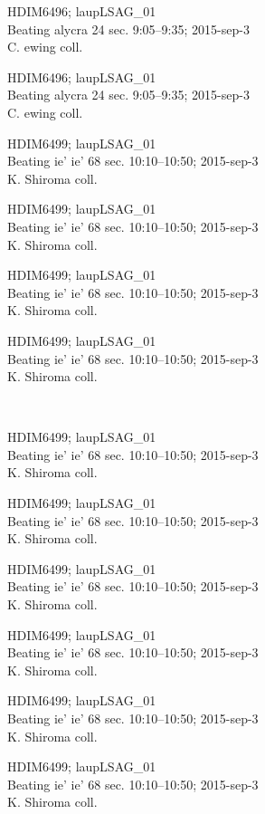 \documentclass[2pt]{extarticle}
\begin{document}
\noindent
\parbox{0.16\textwidth}{\tiny \raggedright \rule[-0.3\baselineskip]{0pt}{10pt}HDIM6496; laupLSAG\_01\\ Beating alycra 24 sec. 9:05--9:35; 2015-sep-3\\ C. ewing coll.}
\parbox{0.16\textwidth}{\tiny \raggedright \rule[-0.3\baselineskip]{0pt}{10pt}HDIM6496; laupLSAG\_01\\ Beating alycra 24 sec. 9:05--9:35; 2015-sep-3\\ C. ewing coll.}
\parbox{0.16\textwidth}{\tiny \raggedright \rule[-0.3\baselineskip]{0pt}{10pt}HDIM6499; laupLSAG\_01\\ Beating ie' ie' 68 sec. 10:10--10:50; 2015-sep-3\\ K. Shiroma coll.}
\parbox{0.16\textwidth}{\tiny \raggedright \rule[-0.3\baselineskip]{0pt}{10pt}HDIM6499; laupLSAG\_01\\ Beating ie' ie' 68 sec. 10:10--10:50; 2015-sep-3\\ K. Shiroma coll.}
\parbox{0.16\textwidth}{\tiny \raggedright \rule[-0.3\baselineskip]{0pt}{10pt}HDIM6499; laupLSAG\_01\\ Beating ie' ie' 68 sec. 10:10--10:50; 2015-sep-3\\ K. Shiroma coll.}
\parbox{0.16\textwidth}{\tiny \raggedright \rule[-0.3\baselineskip]{0pt}{10pt}HDIM6499; laupLSAG\_01\\ Beating ie' ie' 68 sec. 10:10--10:50; 2015-sep-3\\ K. Shiroma coll.} \\ 
\vspace{0.001in} 

\noindent
\parbox{0.16\textwidth}{\tiny \raggedright \rule[-0.3\baselineskip]{0pt}{10pt}HDIM6499; laupLSAG\_01\\ Beating ie' ie' 68 sec. 10:10--10:50; 2015-sep-3\\ K. Shiroma coll.}
\parbox{0.16\textwidth}{\tiny \raggedright \rule[-0.3\baselineskip]{0pt}{10pt}HDIM6499; laupLSAG\_01\\ Beating ie' ie' 68 sec. 10:10--10:50; 2015-sep-3\\ K. Shiroma coll.}
\parbox{0.16\textwidth}{\tiny \raggedright \rule[-0.3\baselineskip]{0pt}{10pt}HDIM6499; laupLSAG\_01\\ Beating ie' ie' 68 sec. 10:10--10:50; 2015-sep-3\\ K. Shiroma coll.}
\parbox{0.16\textwidth}{\tiny \raggedright \rule[-0.3\baselineskip]{0pt}{10pt}HDIM6499; laupLSAG\_01\\ Beating ie' ie' 68 sec. 10:10--10:50; 2015-sep-3\\ K. Shiroma coll.}
\parbox{0.16\textwidth}{\tiny \raggedright \rule[-0.3\baselineskip]{0pt}{10pt}HDIM6499; laupLSAG\_01\\ Beating ie' ie' 68 sec. 10:10--10:50; 2015-sep-3\\ K. Shiroma coll.}
\parbox{0.16\textwidth}{\tiny \raggedright \rule[-0.3\baselineskip]{0pt}{10pt}HDIM6499; laupLSAG\_01\\ Beating ie' ie' 68 sec. 10:10--10:50; 2015-sep-3\\ K. Shiroma coll.} \\ 
\vspace{0.001in} 
\end{document}
